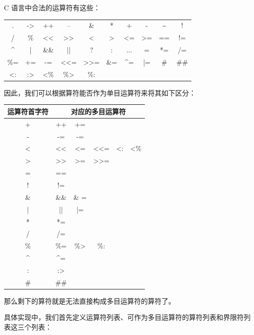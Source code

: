 \documentclass[UTF8]{ctexart}
\begin{document}
C 语言中合法的运算符有这些：

\begin{center}
  \captionsetup{position=above}
  \begin{tabular}{|c c c c c c c c c c|}
    \hline
    . & -> & ++ & -- & \& & * & + & - & \textasciitilde & ! \\
    / & \% & << & >> & < & > & <= & >= & == & != \\
    \textasciicircum & | & \&\& & || & ? & : & ... & = & *= & /= \\
    \%=  & += & -= & <<= & >>= & \&= & \textasciicircum = & |= & \# & \#\# \\
   <: & :> & <\% & \%> & \%: & & & & & \\
    \hline
  \end{tabular}
\end{center}

因此，我们可以根据算符能否作为单目运算符来将其如下区分：

\begin{center}
  \captionsetup{position=above}
  \label{tb:table4}
  \begin{tabular}{ c | c c c c c }
    \hline
    \textbf{运算符首字符} & \multicolumn{5}{c}{\textbf{对应的多目运算符}} \\
    \hline
    + & ++ & += & & & \\
    - & -= & -= & & & \\
    < & << & <= & <<= & <: & <\% \\
    > & >> & >= & >>= \\
    = & == \\
    ! & != \\
    \& & \&\& & \& = \\
    | & || & |= \\
    * & *= \\
    / & /= \\
    \% & \%= & \%> & \%: \\
    \textasciicircum & \textasciicircum= \\
    : & :> \\
    \# & \#\# \\
    \hline
  \end{tabular}
\end{center}

那么剩下的算符就是无法直接构成多目运算符的算符了。

具体实现中，我们首先定义运算符列表、可作为多目运算符的算符列表和界限符列表这三个列表：
\end{document}
